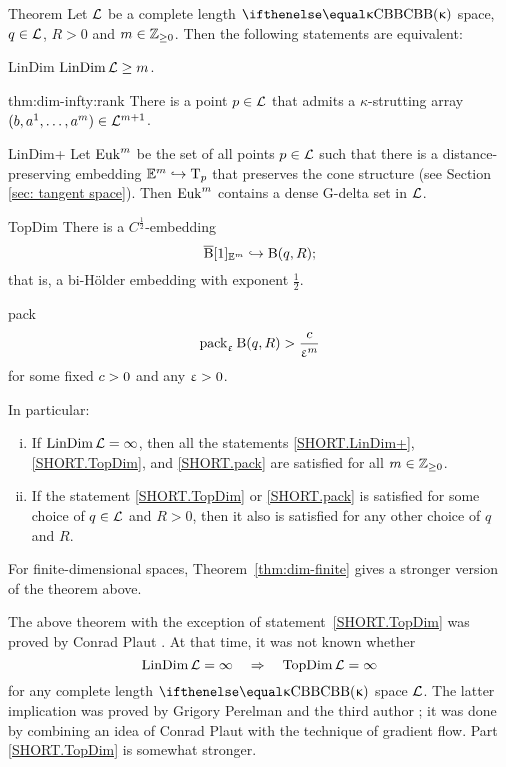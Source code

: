 \begin{thm}{Theorem}\label{thm:dim-infty}
Let $\mathcal{L}$ be a complete length $\Alex{\kappa}$ space, 
$q\in \spc{L}$, 
$R>0$ 
and $m\in \ZZ_{\ge0}$.
Then the following statements are equivalent:
\begin{subthmA}{LinDim} $\LinDim\spc{L}\ge m$.
\end{subthmA}

\begin{subthmA}{thm:dim-infty:rank}
There is a point $p\in\spc{L}$ that admits a $\kappa$-strutting array $(b,a^1,\dots,a^m)\in\spc{L}^{m+1}$.
\end{subthmA}

\begin{subthmA}{LinDim+} Let $\mathop{\rm Euk}\nolimits^m$ be the set 
of all points $p\in \spc{L}$ such that there is a distance-preserving embedding $\EE^m\hookrightarrow \T_p$
that preserves the cone structure 
(see Section \ref{sec: tangent space}).
Then $\mathop{\rm Euk}\nolimits^m$ contains a dense G-delta set in $\mathcal{L}$.
\end{subthmA}

\begin{subthmA}{TopDim}
There is a $C^{\frac{1}{2}}$-embedding
\[\cBall[1]_{\EE^m}\hookrightarrow \oBall(q,R);\]
that is, a bi-Hölder embedding with exponent $\tfrac{1}{2}$.
\end{subthmA}

\begin{subthmA}{pack} 
\[\mathop{\rm pack}\nolimits_\upvarepsilon \mathrm{B}{}(q,R)>\frac{c}{\upvarepsilon^m}\]
for some fixed $c>0$ and any $\upvarepsilon>0$.
\end{subthmA}

\medskip

In particular:
\begin{enumerate}[(i)]
\item If $\mathop{\rm LinDim}\nolimits\mathcal{L}=\infty$, then all the statements \ref{SHORT.LinDim+}, \ref{SHORT.TopDim}, and \ref{SHORT.pack} are satisfied for all $m\in\ZZ_{\ge0}$. 
\item 
 If the statement \ref{SHORT.TopDim} or \ref{SHORT.pack} is satisfied for some choice of $q\in \spc{L}$ and $R>0$, then it also is satisfied for any other choice of $q$ and $R$.
\end{enumerate}
\end{thm}

For finite-dimensional spaces, Theorem~\ref{thm:dim-finite} gives a stronger version 
of the theorem above.

The above theorem with the exception of statement~\ref{SHORT.TopDim} was proved by Conrad Plaut \cite{plaut:dimension}.
At that time, it was not known whether
\[\mathop{\rm LinDim}\nolimits\mathcal{L}=\infty\quad \Rightarrow\quad \mathop{\rm TopDim}\nolimits\mathcal{L}=\infty\]
for any complete length $\Alex\kappa$ space $\mathcal{L}$.
The latter implication was proved by Grigory Perelman and the third author \cite{perelman-petrunin:qg};
it was done by combining an idea of Conrad Plaut with the technique of gradient flow.
Part \ref{SHORT.TopDim} is somewhat stronger.

